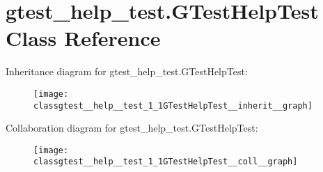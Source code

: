 \hypertarget{classgtest__help__test_1_1GTestHelpTest}{}\section{gtest\+\_\+help\+\_\+test.\+G\+Test\+Help\+Test Class Reference}
\label{classgtest__help__test_1_1GTestHelpTest}


Inheritance diagram for gtest\+\_\+help\+\_\+test.\+G\+Test\+Help\+Test\+:\nopagebreak
\begin{figure}[H]
\begin{center}
\leavevmode
\texttt{[image: classgtest\_\_help\_\_test\_1\_1GTestHelpTest\_\_inherit\_\_graph]}
\end{center}
\end{figure}


Collaboration diagram for gtest\+\_\+help\+\_\+test.\+G\+Test\+Help\+Test\+:\nopagebreak
\begin{figure}[H]
\begin{center}
\leavevmode
\texttt{[image: classgtest\_\_help\_\_test\_1\_1GTestHelpTest\_\_coll\_\_graph]}
\end{center}
\end{figure}
